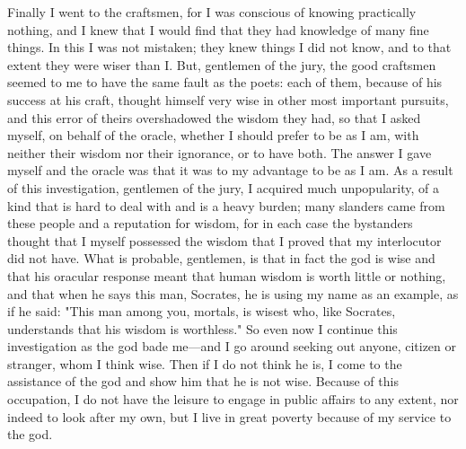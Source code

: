Finally I went to the craftsmen, for I was conscious of knowing practically nothing, and I knew
that I would find that they had knowledge of many fine things. In this I was not mistaken; they
knew things I did not know, and to that extent they were wiser than I. But, gentlemen of the jury,
the good craftsmen seemed to me to have the same fault as the poets: each of them, because of his
success at his craft, thought himself very wise in other most important pursuits, and this error of
theirs overshadowed the wisdom they had, so that I asked myself, on behalf of the oracle, whether
I should prefer to be as I am, with neither their wisdom nor their ignorance, or to have both. The
answer I gave myself and the oracle was that it was to my advantage to be as I am.
As a result of this investigation, gentlemen of the jury, I acquired much unpopularity, of a kind that
is hard to deal with and is a heavy burden; many slanders came from these people and a reputation
for wisdom, for in each case the bystanders thought that I myself possessed the wisdom that I
proved that my interlocutor did not have. What is probable, gentlemen, is that in fact the god is
wise and that his oracular response meant that human wisdom is worth little or nothing, and that
when he says this man, Socrates, he is using my name as an example, as if he said: "This man
among you, mortals, is wisest who, like Socrates, understands that his wisdom is worthless." So
even now I continue this investigation as the god bade me—and I go around seeking out anyone,
citizen or stranger, whom I think wise. Then if I do not think he is, I come to the assistance of the
god and show him that he is not wise. Because of this occupation, I do not have the leisure to
engage in public affairs to any extent, nor indeed to look after my own, but I live in great poverty
because of my service to the god.

